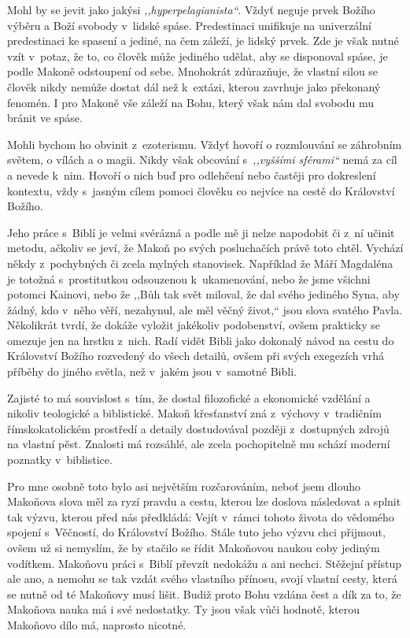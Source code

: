Mohl by se jevit jako jakýsi \textit{,,hyperpelagianista``}. Vždyť neguje prvek
Božího výběru a Boží svobody v~lidské spáse. Predestinaci unifikuje na
univerzální predestinaci ke spasení a jediné, na čem záleží, je lidský prvek.
Zde je však nutné vzít v~potaz, že to, co člověk může jediného udělat, aby se
disponoval spáse, je podle Makoně odstoupení od sebe. Mnohokrát zdůrazňuje, že
vlastní silou se člověk nikdy nemůže dostat dál než k~extázi, kterou zavrhuje
jako překonaný fenomén. I pro Makoně vše záleží na Bohu, který však nám dal
svobodu mu bránit ve spáse.

Mohli bychom ho obvinit z~ezoterismu. Vždyť hovoří o rozmlouvání se záhrobním
světem, o vílách a o magii. Nikdy však obcování s~\textit{,,vyššími sférami``}
nemá za cíl a nevede k~nim. Hovoří o nich buď pro odlehčení nebo častěji pro
dokreslení kontextu, vždy s~jasným cílem pomoci člověku co nejvíce na cestě do
Království Božího.

Jeho práce s~Biblí je velmi svérázná a podle mě ji nelze napodobit či z~ní
učinit metodu, ačkoliv se jeví, že Makoň po svých posluchačích právě toto chtěl.
Vychází někdy z~pochybných či zcela mylných stanovisek. Například že Máří
Magdaléna je totožná s~prostitutkou odsouzenou k~ukamenování, nebo že jsme
všichni potomci Kainovi, nebo že ,,Bůh tak svět miloval, že dal svého jediného
Syna, aby žádný, kdo v~něho věří, nezahynul, ale měl věčný život,`` jsou slova
svatého Pavla. Několikrát tvrdí, že dokáže vyložit jakékoliv podobenství, ovšem
prakticky se omezuje jen na hrstku z~nich. Radí vidět Bibli jako dokonalý návod
na cestu do Království Božího rozvedený do všech detailů, ovšem při svých
exegezích vrhá příběhy do jiného světla, než v~jakém jsou v~samotné Bibli.

Zajisté to má souvislost s~tím, že dostal filozofické a ekonomické vzdělání a
nikoliv teologické a biblistické. Makoň křesťanství zná z~výchovy v~tradičním
římskokatolickém prostředí a detaily dostudovával později z~dostupných zdrojů na
vlastní pěst. Znalosti má rozsáhlé, ale zcela pochopitelně mu schází moderní
poznatky v~biblistice.

Pro mne osobně toto bylo asi největším rozčarováním, neboť jsem dlouho Makoňova
slova měl za ryzí pravdu a cestu, kterou lze doslova následovat a splnit tak
výzvu, kterou před nás předkládá: Vejít v~rámci tohoto života do vědomého
spojení s~Věčností, do Království Božího. Stále tuto jeho výzvu chci přijmout,
ovšem už si nemyslím, že by stačilo se řídit Makoňovou naukou coby jediným
vodítkem. Makoňovu práci s~Biblí převzít nedokážu a ani nechci. Stěžejní přístup
ale ano, a nemohu se tak vzdát svého vlastního přínosu, svojí vlastní cesty,
která se nutně od té Makoňovy musí lišit. Budiž proto Bohu vzdána čest a dík za
to, že Makoňova nauka má i své nedostatky. Ty jsou však vůči hodnotě, kterou
Makoňovo dílo má, naprosto nicotné.

